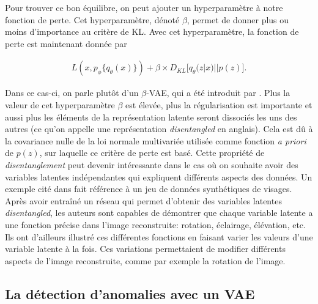 Pour trouver ce bon équilibre, on peut ajouter un hyperparamètre à notre fonction de perte. Cet hyperparamètre, dénoté $\beta$, permet de donner plus ou moins d'importance au critère de KL. Avec cet hyperparamètre, la fonction de perte est maintenant donnée par

\begin{gather}  \label{eq:loss_betavae}
L(x, p_\phi\{q_\theta(x)\}) +  \beta \times D_{KL}\big[q_\theta(z|x) || p(z)\big].
\end{gather}

Dans ce cas-ci, on parle plutôt d'un $\beta$-VAE, qui a été introduit par \cite{Higgins2017betaVAELB}. Plus la valeur de cet hyperparamètre $\beta$ est élevée, plus la régularisation est importante et aussi plus les éléments de la représentation latente seront dissociés les uns des autres (ce qu'on appelle une représentation \textit{disentangled} en anglais). Cela est dû à la covariance nulle de la loi normale multivariée utilisée comme fonction \textit{a priori} de $p(z)$, sur laquelle ce critère de perte est basé. Cette propriété de \textit{disentanglement} peut devenir intéressante dans le cas où \DIFaddbegin {}\DIFaddend on souhaite avoir des variables latentes indépendantes qui expliquent différents aspects des données. Un exemple cité dans \cite{Higgins2017betaVAELB} fait référence à un jeu de données synthétiques de visages. Après avoir entraîné un réseau qui permet d'obtenir des variables latentes \textit{disentangled}, les auteurs sont capables de démontrer que chaque variable latente a une fonction précise dans l'image reconstruite: rotation, éclairage, élévation, etc. Ils ont d'ailleurs illustré ces différentes fonctions en faisant varier les valeurs d'une variable latente à la fois. Ces variations permettaient de modifier différents aspects de l'image reconstruite, comme par exemple la rotation de l'image.

\subsection{La détection d'anomalies avec un VAE}

